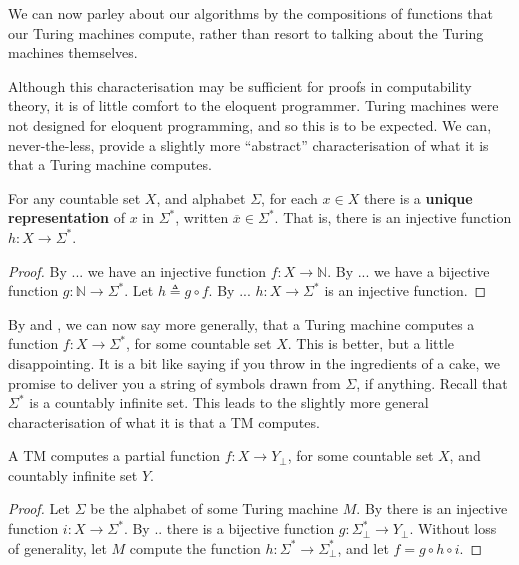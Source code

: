 We can now parley about our algorithms by the compositions of functions that
our Turing machines compute, rather than resort to talking about the Turing
machines themselves.

Although this characterisation may be sufficient for proofs in computability
theory, it is of little comfort to the eloquent programmer. Turing machines
were not designed for eloquent programming, and so this is to be expected.  We
can, never-the-less, provide a slightly more ``abstract'' characterisation of
what it is that a Turing machine computes.


\begin{theorem}\label{thm:unique-representation} For any countable set $X$, and
alphabet $\Sigma$, for each $x\in X$ there is a \textbf{unique representation}
of $x$ in $\Sigma^*$, written $\overline{x}\in\Sigma^*$. That is, there is an
injective function $h:X\rightarrow \Sigma^*$. \end{theorem}

\begin{proof} By ... we have an injective function $f:X\rightarrow \mathbb{N}$.
By ... we have a bijective function $g:\mathbb{N}\rightarrow\Sigma^*$. Let
$h\triangleq g\circ f$. By ...  $h : X\rightarrow \Sigma^*$ is an injective
function.  \end{proof}

By  and , we can
now say more generally, that a Turing machine computes a function
$f:X\rightarrow \Sigma^*$, for some countable set $X$. This is better, but a
little disappointing. It is a bit like saying if you throw in the ingredients
of a cake, we promise to deliver you a string of symbols drawn from $\Sigma$,
if anything. Recall that $\Sigma^*$ is a countably infinite set. This leads to
the slightly more general characterisation of what it is that a TM computes.

\begin{corollary} A TM computes a partial function $f:X\rightarrow Y_\bot$, for
some countable set $X$, and countably infinite set $Y$. \end{corollary}

\begin{proof} Let $\Sigma$ be the alphabet of some Turing machine $M$. By
 there is an injective function $i : X
\rightarrow \Sigma^*$. By .. there is a bijective function $g : \Sigma^*_\bot
\rightarrow Y_\bot$. Without loss of generality, let $M$ compute the function
$h : \Sigma^* \rightarrow \Sigma^*_\bot$, and let $f = g \circ h \circ i$.
\end{proof} 

